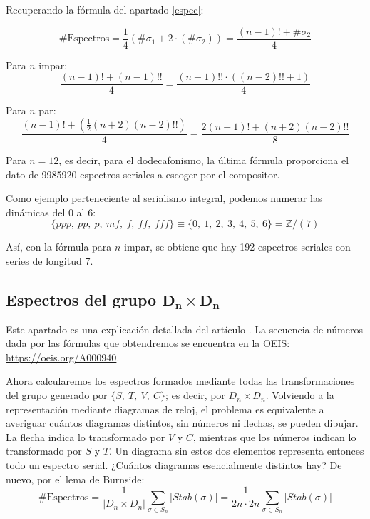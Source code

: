 		Recuperando la f\'ormula del apartado \ref{espec}:
		
		\[\#\mbox{Espectros}=
		\frac{1}{4}\left(\#\sigma_1+2\cdot(\#\sigma_2)\right)=
		\frac{(n-1)!+\#\sigma_2}{4}\]
		
		Para $n$ impar:
		\[\frac{(n-1)!+(n-1)!!}{4}=\frac{(n-1)!!\cdot\left((n-2)!!+1\right)}{4}\]
		
		Para $n$ par:
		\[\frac{(n-1)!+\left(\frac{1}{2}(n+2)(n-2)!!\right)}{4}=\frac{2(n-1)!+(n+2)(n-2)!!}{8}\]
		
		Para $n=12$, es decir, para el dodecafonismo, la \'ultima f\'ormula proporciona el dato de 9985920 espectros seriales a escoger por el compositor.
		
		Como ejemplo perteneciente al serialismo integral, podemos numerar las din\'amicas del 0 al 6:
		\[\{ppp,\ pp,\ p,\ m\!f,\ f,\ f\!\!f,\ f\!\!f\!\!f\} \equiv \{0,\ 1,\ 2,\ 3,\ 4,\ 5,\ 6\} = \mathbb{Z} / (7)\]
		
		As\'i, con la f\'ormula para $n$ impar, se obtiene que hay 192 espectros seriales con series de longitud 7.
	
	
	\subsection[Espectros del grupo $D_n\times D_n$]{Espectros del grupo $\bm{D_n\times D_n}$}
	
		Este apartado es una explicaci\'on detallada del art\'iculo \cite{polygons}. La secuencia de n\'umeros dada por las f\'ormulas que obtendremos se encuentra en la OEIS: \url{https://oeis.org/A000940}.
	
		\begin{figure}[h]
			\begin{center}
			\end{center}
		\end{figure}
		Ahora calcularemos los espectros formados mediante todas las transformaciones del grupo generado por $\{S,\ T,\ V,\ C\}$; es decir, por ${D}_{n}\times {D}_{n}$. Volviendo a la representaci\'on mediante diagramas de reloj, el problema es equivalente a averiguar cu\'antos diagramas distintos, sin n\'umeros ni flechas, se pueden dibujar. La flecha indica lo transformado por $V$ y $C$, mientras que los n\'umeros indican lo transformado por $S$ y $T$. Un diagrama sin estos dos elementos representa entonces todo un espectro serial. ¿Cu\'antos diagramas esencialmente distintos hay? De nuevo, por el lema de Burnside:
		\[\#\mbox{Espectros}=\frac{1}{|{D}_{n}\times{D}_{n}|}\sum_{\sigma\in{S}_n}|{Stab}(\sigma)|=\frac{1}{2n\cdot2n}\sum_{\sigma\in{S}_n}|{Stab}(\sigma)|\]
		
